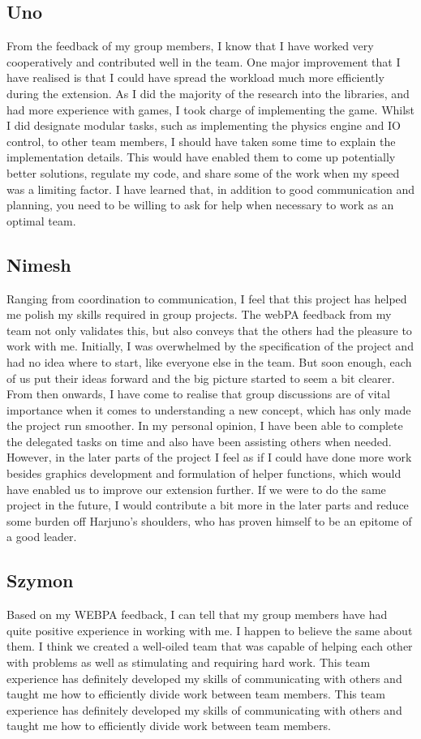 \documentclass[11pt]{article}
\begin{document}
\subsection{Uno}
From the feedback of my group members, I know that I have worked very cooperatively and contributed well in the team. One major improvement that I have realised is that I could have spread the workload much more efficiently during the extension. As I did the majority of the research into the libraries, and had more experience with games, I took charge of implementing the game. Whilst I did designate modular tasks, such as implementing the physics engine and IO control, to other team members, I should have taken some time to explain the implementation details. This would have enabled them to come up potentially better solutions, regulate my code, and share some of the work when my speed was a limiting factor. I have learned that, in addition to good communication and planning, you need to be willing to ask for help when necessary to work as an optimal team.
\subsection{Nimesh}
Ranging from coordination to communication, I feel that this project has helped me polish my skills required in group projects. The webPA feedback from my team not only validates this, but also conveys that the others had the pleasure to work with me. Initially, I was overwhelmed by the specification of the project and had no idea where to start, like everyone else in the team. But soon enough, each of us put their ideas forward and the big picture started to seem a bit clearer. From then onwards, I have come to realise that group discussions are of vital importance when it comes to understanding a new concept, which has only made the project run smoother. In my personal opinion, I have been able to complete the delegated tasks on time and also have been assisting others when needed. However, in the later parts of the project I feel as if I could have done more work besides graphics development and formulation of helper functions, which would have enabled us to improve our extension further. If we were to do the same project in the future, I would contribute a bit more in the later parts and reduce some burden off Harjuno's shoulders, who has proven himself to be an epitome of a good leader.
\subsection{Szymon}
Based on my WEBPA feedback, I can tell that my group members have had quite positive experience in working with me. I happen to believe the same about them. I think we created a well-oiled team that was capable of helping each other with problems as well as stimulating and requiring hard work. This team experience has definitely developed my skills of communicating with others and taught me how to efficiently divide work between team members. This team experience has definitely developed my skills of communicating with others and taught me how to efficiently divide work between team members.
\end{document}
